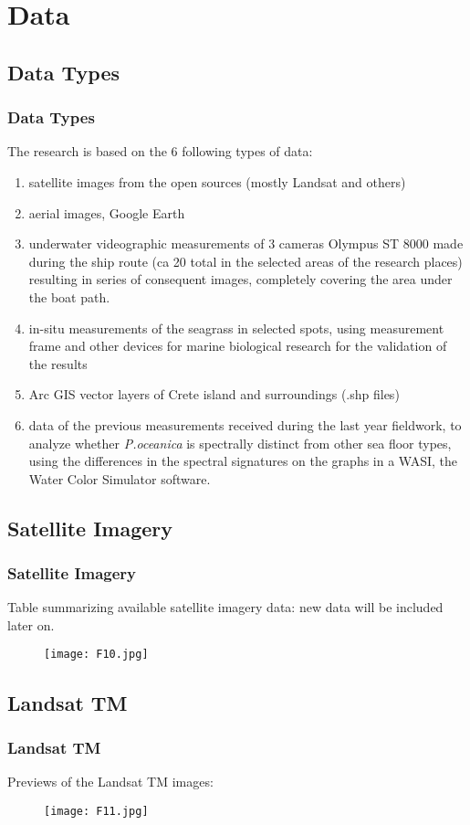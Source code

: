 \documentclass[pdflatex,compress,8pt,
	xcolor={dvipsnames,dvipsnames,svgnames,x11names,table},
	hyperref={colorlinks = true,breaklinks = true, urlcolor = NavyBlue, breaklinks = true}]{beamer}
\begin{document}
\section{Data}
\subsection{Data Types}
\begin{frame}\frametitle{Data Types}
The research is based on the 6 following types of data:
\begin{enumerate}
	\item satellite images from the open sources (mostly Landsat and others)
	\item aerial images, Google Earth
	\item underwater videographic measurements of 3 cameras Olympus ST 8000 made during the ship route (ca 20 total in the selected areas of the research places) resulting in series of consequent images, completely covering the area under the boat path.
	\item in-situ measurements of the seagrass in selected spots, using measurement frame and other devices for marine biological research for the validation of the results
	\item Arc GIS vector layers of Crete island and surroundings (.shp files)
	\item data of the previous measurements received during the last year fieldwork, to analyze whether \emph{P.oceanica} is spectrally distinct from other sea floor types, using the differences in the spectral signatures on the graphs in a WASI, the Water Color Simulator software.
\end{enumerate}
\end{frame}

\subsection{Satellite Imagery}
\begin{frame}\frametitle{Satellite Imagery}
Table summarizing available satellite imagery data: new data will be included later on.
 \begin{figure}[H]
	\centering
		\texttt{[image: F10.jpg]}
\end{figure}
\end{frame}

\subsection{Landsat TM}
\begin{frame}\frametitle{Landsat TM}
Previews of the Landsat TM images:
 \begin{figure}[H]
	\centering
		\texttt{[image: F11.jpg]}
\end{figure}
\end{frame}
\end{document}
